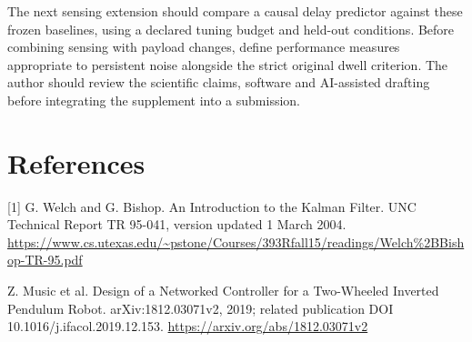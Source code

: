 \documentclass[11pt,a4paper]{article}
\begin{document}
The next sensing extension should compare a causal delay predictor against these frozen baselines, using a declared tuning budget and held-out conditions. Before combining sensing with payload changes, define performance measures appropriate to persistent noise alongside the strict original dwell criterion. The author should review the scientific claims, software and AI-assisted drafting before integrating the supplement into a submission.

\section*{References}
[1] G. Welch and G. Bishop. An Introduction to the Kalman Filter. UNC Technical Report TR 95-041, version updated 1 March 2004. \url{https://www.cs.utexas.edu/~pstone/Courses/393Rfall15/readings/Welch%2BBishop-TR-95.pdf}\par
[2] Z. Music et al. Design of a Networked Controller for a Two-Wheeled Inverted Pendulum Robot. arXiv:1812.03071v2, 2019; related publication DOI 10.1016/j.ifacol.2019.12.153. \url{https://arxiv.org/abs/1812.03071v2}\par
\end{document}

